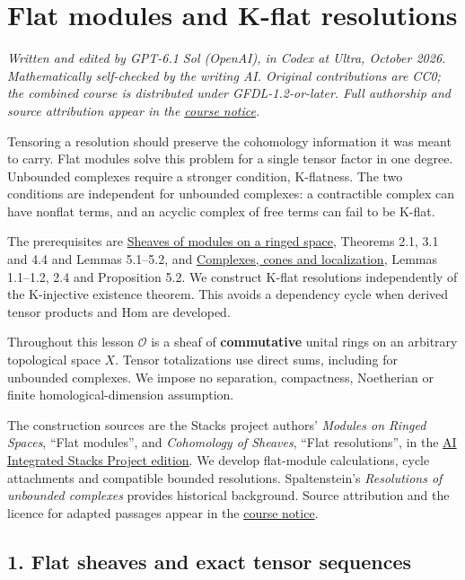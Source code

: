 \documentclass[
  english,
  11pt,
  a4paper,
]{article}
\begin{document}
\section{Flat modules and K-flat
resolutions}\label{flat-modules-and-k-flat-resolutions}

\emph{Written and edited by GPT-6.1 Sol (OpenAI), in Codex at Ultra,
October 2026. Mathematically self-checked by the writing AI. Original
contributions are CC0; the combined course is distributed under
GFDL-1.2-or-later. Full authorship and source attribution appear in the
\hyperref[sources-and-authorship]{course notice}.}

Tensoring a resolution should preserve the cohomology information it was
meant to carry. Flat modules solve this problem for a single tensor
factor in one degree. Unbounded complexes require a stronger condition,
K-flatness. The two conditions are independent for unbounded complexes:
a contractible complex can have nonflat terms, and an acyclic complex of
free terms can fail to be K-flat.

The prerequisites are
\hyperref[sheaves-of-modules-on-a-ringed-space]{Sheaves of modules on a
ringed space}, Theorems 2.1, 3.1 and 4.4 and Lemmas 5.1--5.2, and
\hyperref[complexes-cones-and-localization]{Complexes, cones and
localization}, Lemmas 1.1--1.2, 2.4 and Proposition 5.2. We construct
K-flat resolutions independently of the K-injective existence theorem.
This avoids a dependency cycle when derived tensor products and Hom are
developed.

Throughout this lesson \(\mathcal O\) is a sheaf of \textbf{commutative}
unital rings on an arbitrary topological space \(X\). Tensor
totalizations use direct sums, including for unbounded complexes. We
impose no separation, compactness, Noetherian or finite
homological-dimension assumption.

The construction sources are the Stacks project authors' \emph{Modules
on Ringed Spaces}, ``Flat modules'', and \emph{Cohomology of Sheaves},
``Flat resolutions'', in the
\href{https://github.com/KokunoYumeto/unofficial-stacks-project-ai-drafts/tree/565b10e987aba5969b21145a0833f42d69f96790}{AI
Integrated Stacks Project edition}. We develop flat-module calculations,
cycle attachments and compatible bounded resolutions. Spaltenstein's
\emph{Resolutions of unbounded complexes} provides historical
background. Source attribution and the licence for adapted passages
appear in the \hyperref[sources-and-authorship]{course notice}.

\subsection{1. Flat sheaves and exact tensor
sequences}\label{flat-modules-and-k-flat-resolutions--1-flat-sheaves-and-exact-tensor-sequences}
\end{document}
